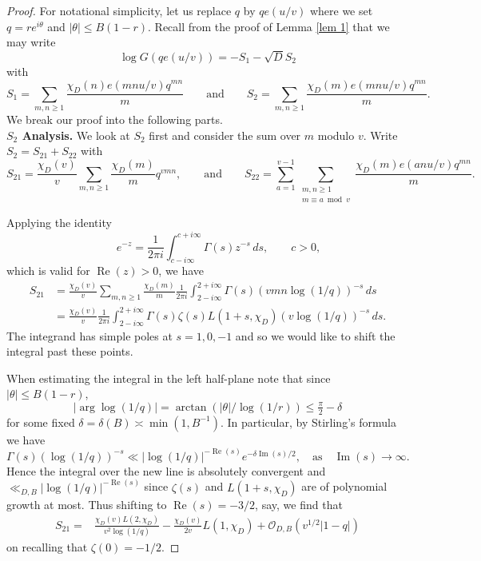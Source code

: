 \documentclass[10pt,a4paper]{amsart}
\begin{document}
\begin{proof}
For notational simplicity, let us replace $q$ by $qe(u/v)$ where we set $q=re^{i\theta}$ and $|\theta|\leq B(1-r)$. Recall from the proof of Lemma \ref{lem 1} that we may write
\begin{equation}\label{log F twist}
\log G(qe(u/v))=-S_1-\sqrt{D}S_2
\end{equation}
with 
\[
S_1
=
\sum_{m,n\geq 1}\frac{\chi_D(n)e(mnu/v)q^{mn}}{m}
\qquad \textrm{and} \qquad
S_2
=
\sum_{m,n\geq 1}\frac{\chi_D(m)e(mnu/v)q^{mn}}{m}.
\]
We break our proof into the following parts.\\

 \noindent \textbf{$S_2$ Analysis.} We look at $S_2$ first and consider the sum over $m$ modulo $v$. Write $S_2=S_{21}+S_{22}$ with 
 \[
 S_{21}
 =
 \frac{\chi_D(v)}{v}\sum_{m,n\geq 1}\frac{\chi_D(m)}{m}q^{vmn},
 \qquad \textrm{and} \qquad
 S_{22}
 =
 \sum_{a=1}^{v-1}\sum_{\substack{m,n\geq 1 \\ m\equiv a \bmod v}}
 \frac{\chi_D(m)e(anu/v)q^{mn}}{m}.
 \]

Applying the identity
\begin{equation}\label{mellin}
\qquad e^{-z}=\frac{1}{2\pi i }\int_{c-i\infty}^{c+i\infty}\Gamma(s)z^{-s}\, ds, \qquad c>0,
\end{equation}
which is valid for $\operatorname{Re}(z)>0$, we have
\begin{align*}
S_{21} &=
\frac{\chi_D(v)}{v}
\sum_{m,n\geq 1}\frac{\chi_D(m)}{m}
\frac{1}{2\pi i }\int_{2-i\infty}^{2+i\infty}\Gamma(s)(vmn\log(1/q))^{-s} \, ds
\\
&=
\frac{\chi_D(v)}{v}
\frac{1}{2\pi i }\int_{2-i\infty}^{2+i\infty}
\Gamma(s)\zeta(s)L(1+s,\chi_D)(v\log(1/q))^{-s}\, ds.
\end{align*}
The integrand has simple poles at $s=1,0,-1$ and so we would like to shift the integral past these points. 

When estimating the integral in the left half-plane note that since $|\theta|\leq B(1-r)$, 
\[
|\arg \log(1/q)|=\arctan(|\theta|/\log(1/r))\leq \tfrac{\pi}{2}-\delta
\] 
for some fixed $\delta=\delta(B)\asymp \min (1,B^{-1})$. In particular, by Stirling's formula we have 
\[
\Gamma(s)(\log(1/q))^{-s}\ll |\log(1/q)|^{-\operatorname{Re}(s)} e^{-\delta \operatorname{Im}(s)/2}, \quad \textrm{as} \quad \operatorname{Im}(s)\to\infty.
\]
Hence the integral over the new line is absolutely convergent and $\ll_{D,B} |\log(1/q)|^{-\operatorname{Re}(s)}$ since $\zeta(s)$ and $L(1+s,\chi_D)$  are of polynomial growth at most.
Thus shifting to $\operatorname{Re}(s)=-3/2$, say, we find that 
\begin{align*}
S_{21}
= &
\frac{\chi_D(v)L(2,\chi_D)}{v^2\log(1/q)}
-\frac{\chi_D(v)}{2v}
L(1,\chi_D)
+\mathcal{O}_{D,B}(v^{1/2}|1-q|)
\end{align*}
on recalling that $\zeta(0)=-1/2$. 



\end{proof}
\end{document}
